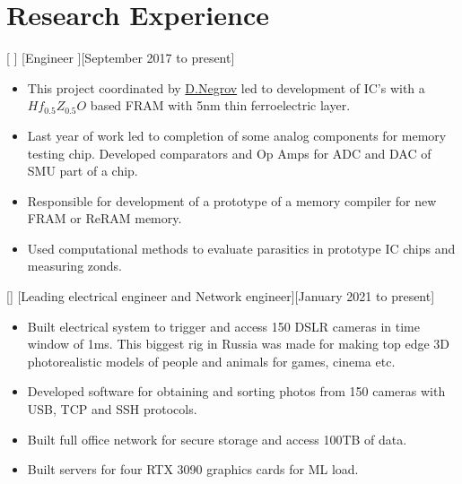 \documentclass{article}
\begin{document}
\section{Research Experience}
 
[   ]
[Engineer ][September 2017 to present]
 
\begin{itemize}
\item This project coordinated by  \href{https://www.scopus.com/authid/detail.uri?authorId=56272708000}{D.Negrov}   led to development of IC's with a $Hf_{0.5} Z_{0.5} O $ based  FRAM with 5nm thin ferroelectric layer.
\item Last year of work led to completion of some analog components for memory testing chip. Developed comparators and Op Amps for ADC and DAC of SMU part of a chip.
\item Responsible for development of a prototype of a memory  compiler for new FRAM or ReRAM memory.
\item Used computational methods to evaluate parasitics in prototype IC chips and measuring zonds.
 
\end{itemize}
 
[]
[Leading electrical engineer and Network engineer][January 2021 to present]
 
\begin{itemize}
   \item Built electrical system to trigger and access 150 DSLR cameras in time window of 1ms. This biggest rig in Russia was made for making top edge 3D photorealistic models of people and animals for games, cinema etc.
   \item Developed software for obtaining and sorting photos from 150 cameras with USB, TCP and SSH protocols.
   \item Built full office network for secure storage and access 100TB of data.
   \item Built servers for four RTX 3090 graphics cards for ML load. 
   \end{itemize}
 
\end{document}
